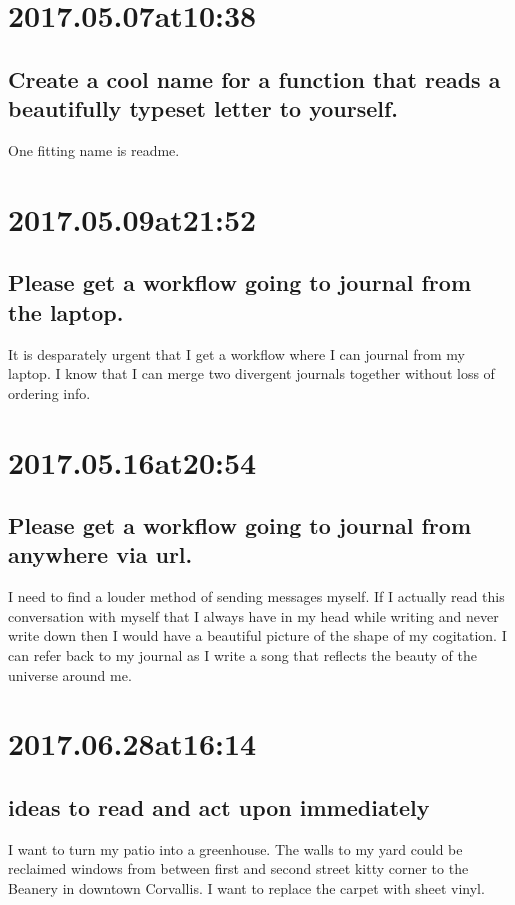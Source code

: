 \section*{ 2017.05.07at10:38 }
\subsection*{ Create a cool name for a function that reads a beautifully typeset letter to yourself. }
One fitting name is readme.

\section*{ 2017.05.09at21:52 }
\subsection*{ Please get a workflow going to journal from the laptop. }
It is desparately urgent that I get a workflow where I can journal from my laptop.
I know that I can merge two divergent journals together without loss of ordering info.

\section*{ 2017.05.16at20:54 }
\subsection*{ Please get a workflow going to journal from anywhere via url. }
I need to find a louder method of sending messages myself.
If I actually read this conversation with myself that I always have in my head while writing and never write down then I would have a beautiful picture of the shape of my cogitation.
I can refer back to my journal as I write a song that reflects the beauty of the universe around me.

\section*{ 2017.06.28at16:14 }
\subsection*{ ideas to read and act upon immediately }
I want to turn my patio into a greenhouse.
The walls to my yard could be reclaimed windows from between first and second street kitty corner to the Beanery in downtown Corvallis.
I want to replace the carpet with sheet vinyl.

